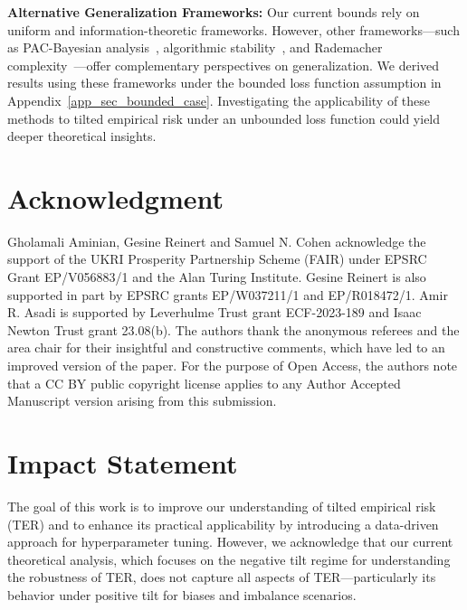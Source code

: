 \documentclass{article}
\theoremstyle{plain}
\theoremstyle{plain}
\theoremstyle{definition}
\theoremstyle{remark}
\begin{document}
\textbf{Alternative Generalization Frameworks:} Our current bounds rely on uniform  and information-theoretic frameworks. However, other frameworks—such as PAC-Bayesian analysis~\citep{catoni2003pac}, algorithmic stability~\citep{bousquet2002stability}, and Rademacher complexity~\citep{bartlett2002rademacher}—offer complementary perspectives on generalization. We derived results using these frameworks under the bounded loss function assumption in Appendix~\ref{app_sec_bounded_case}. Investigating the applicability of these methods to tilted empirical risk under an unbounded loss function could yield deeper theoretical insights. 

 
 

\section*{Acknowledgment}
Gholamali Aminian, Gesine Reinert and Samuel N. Cohen acknowledge the support of the UKRI Prosperity Partnership Scheme (FAIR) under EPSRC Grant EP/V056883/1 and the Alan Turing Institute. Gesine Reinert is also supported in part by EPSRC grants EP/W037211/1 and EP/R018472/1. Amir R. Asadi is supported by Leverhulme Trust grant ECF-2023-189 and Isaac Newton Trust grant 23.08(b). The authors thank the anonymous referees and the
area chair for their insightful and constructive comments,
which have led to an improved version of the
paper. For the purpose of Open Access, the authors note that a CC BY public copyright license applies to any Author Accepted Manuscript version arising from this submission.



\section*{Impact Statement}

The goal of this work is to improve our understanding of tilted empirical risk (TER) and to enhance its practical applicability by introducing a data-driven approach for hyperparameter tuning. However, we acknowledge that our current theoretical analysis, which focuses on the negative tilt regime for understanding the robustness of TER, does not capture all aspects of TER—particularly its behavior under positive tilt for biases and imbalance scenarios.

\end{document}
